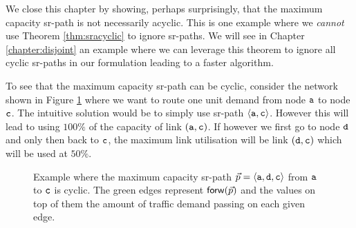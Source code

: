 We close this chapter by showing, perhaps surprisingly, that the maximum capacity sr-path is not necessarily acyclic. This is one example
where we \emph{cannot} use Theorem \ref{thm:sracyclic} to ignore sr-paths. We will see in Chapter \ref{chapter:disjoint} an example where we can
leverage this theorem to ignore all cyclic sr-paths in our formulation leading to a faster algorithm.

To see that the maximum capacity sr-path can be cyclic, consider the network shown in Figure \ref{fig:cyclic_opt} where we want to route
one unit demand from node $\texttt{a}$ to node $\texttt{c}$. The intuitive solution would be to simply use sr-path $\langle \texttt{a}, \texttt{c} \rangle$.
However this will lead to using $100\%$ of the capacity of link $(\texttt{a}, \texttt{c})$. If however we first go to node $\texttt{d}$ and only then back to $\texttt{c}$,
the maximum link utilisation will be link $(\texttt{d}, \texttt{c})$ which will be used at $50\%$.

\begin{figure}[H]
\begin{center}
\end{center}
\caption{Example where the maximum capacity sr-path $\vec{p} = \langle \texttt{a}, \texttt{d}, \texttt{c} \rangle$ from $\texttt{a}$ to $\texttt{c}$ is cyclic.
The green edges represent $\mathsf{forw}(\vec{p})$ and the values on top of them the amount of traffic demand passing on each given edge.}
\label{fig:cyclic_opt}
\end{figure}

